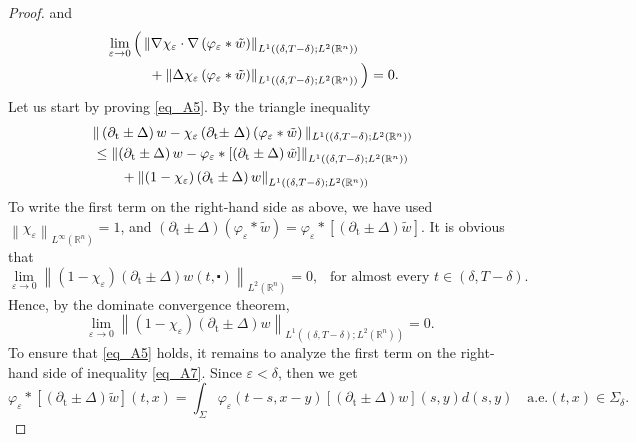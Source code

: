 \documentclass[10pt,a4paper]{amsart}
\theoremstyle{remark}
\theoremstyle{definition}
\begin{document}
\begin{proof}
and
\begin{align}\label{eq_A6} 
 &\lim _{\varepsilon \rightarrow 0}\Big(\left\|\nabla \chi_{\varepsilon} \cdot \nabla\left(\varphi_{\varepsilon} \ast \tilde{w}\right)\right\|_{L^1\left((\delta, T-\delta) ; L^2\left(\mathbb{R}^n\right)\right)}
 \cr&\qquad\quad+\left\|\Delta \chi_{\varepsilon}\left(\varphi_{\varepsilon} \ast \tilde{w}\right)\right\|_{L^1\left((\delta, T-\delta) ; L^2\left(\mathbb{R}^n\right)\right)}\Big)
 =0.   
\end{align}
Let us start by proving \eqref{eq_A5}. By the triangle inequality
\begin{align}\label{eq_A7}
&\|\left(\partial_{\mathrm{t}}\pm\Delta\right) w-\chi_{\varepsilon}\left( \partial_{\mathrm{t}}\pm\right.  \Delta)\left(\varphi_{\varepsilon} \ast \tilde{w}\right) \|_{L^1\left((\delta, T-\delta) ; L^2\left(\mathbb{R}^n\right)\right)} \cr
&\leq  \left\|\left( \partial_{\mathrm{t}}\pm\Delta\right) w-\varphi_{\varepsilon} \ast\left[\left( \partial_{\mathrm{t}}\pm\Delta\right) \tilde{w}\right]\right\|_{L^1\left((\delta, T-\delta) ; L^2\left(\mathbb{R}^n\right)\right)} \cr
&\qquad+\left\|\left(1-\chi_{\varepsilon}\right)\left( \partial_{\mathrm{t}}\pm\Delta\right) w\right\|_{L^1\left((\delta, T-\delta) ; L^2\left(\mathbb{R}^n\right)\right)}    
\end{align}
To write the first term on the right-hand side as above, we have used $\left\|\chi_{\varepsilon}\right\|_{L^{\infty}\left(\mathbb{R}^n\right)}=1$, and $\left( \partial_{\mathrm{t}}\pm\Delta\right)\left(\varphi_{\varepsilon} \ast \tilde{w}\right)=\varphi_{\varepsilon} \ast\left[\left( \partial_{\mathrm{t}}\pm\Delta\right) \tilde{w}\right]$. It is obvious that
$$
\lim _{\varepsilon \rightarrow 0}\left\|\left(1-\chi_{\varepsilon}\right)\left( \partial_{\mathrm{t}}\pm\Delta\right) w(t, \centerdot)\right\|_{L^2\left(\mathbb{R}^n\right)}=0,~~ \text { for almost every } t \in(\delta, T-\delta) .
$$
Hence, by the dominate convergence theorem,
$$
\lim _{\varepsilon \rightarrow 0}\left\|\left(1-\chi_{\varepsilon}\right)\left( \partial_{\mathrm{t}}\pm\Delta\right) w\right\|_{L^1\left((\delta, T-\delta) ; L^2\left(\mathbb{R}^n\right)\right)}=0 .
$$
To ensure that \eqref{eq_A5} holds, it remains to analyze the first term on the right-hand side of inequality \eqref{eq_A7}. Since $\varepsilon<\delta$, then we get
$$
\varphi_{\varepsilon} \ast\left[\left( \partial_{\mathrm{t}}\pm\Delta\right) \tilde{w}\right](t, x)=\int_{\Sigma} \varphi_{\varepsilon}(t-s, x-y)\left[\left( \partial_{\mathrm{t}}\pm\Delta\right) w\right](s, y)d(s, y) \quad \text {a.e.}(t, x) \in \Sigma_\delta .
$$
\end{proof}
\end{document}
